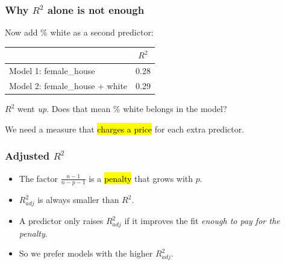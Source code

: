 \documentclass[slidestop,compress,mathserif]{beamer}
\begin{document}
\begin{frame}
\frametitle{Why $R^2$ alone is not enough}

Now add \% white as a second predictor:

{\small
\begin{center}
\begin{tabular}{l c}
\toprule
 & $R^2$ \\
\midrule
Model 1: female\_house & 0.28 \\
Model 2: female\_house + white & 0.29 \\
\bottomrule
\end{tabular}
\end{center}}

$R^2$ went \emph{up}. Does that mean \% white belongs in the model?

\pause
{}

\pause
We need a measure that \hl{charges a price} for each extra predictor.

\end{frame}
\begin{frame}
\frametitle{Adjusted $R^2$}


\begin{itemize}
\item The factor $\frac{n-1}{n-p-1}$ is a \hl{penalty} that grows with $p$.
\item $R^2_{adj}$ is always smaller than $R^2$.
\item A predictor only raises $R^2_{adj}$ if it improves the fit \emph{enough to pay for the penalty}.
\item So we prefer models with the higher $R^2_{adj}$.
\end{itemize}

\end{frame}
\end{document}

